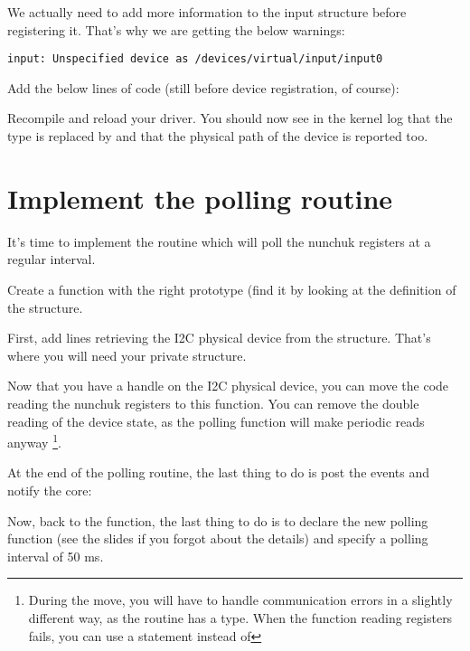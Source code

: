 We actually need to add more information to the input structure before
registering it. That's why we are getting the below warnings:

\begin{verbatim}
input: Unspecified device as /devices/virtual/input/input0
\end{verbatim}

Add the below lines of code (still before device registration, of
course):


Recompile and reload your driver. You should now see in the kernel log
that the  type is replaced by 
 and that the physical path of the device is reported
too. 

\section{Implement the polling routine}

It's time to implement the routine which will poll the nunchuk registers
at a regular interval. 

Create a  function with the right prototype (find
it by looking at the definition of the  structure.

First, add lines retrieving the I2C physical device from the
 structure. That's where you will need your
private  structure.

Now that you have a handle on the I2C physical device, you can move the
code reading the nunchuk registers to this function. You can
remove the double reading of the device state, as the polling function
will make periodic reads anyway \footnote{During the move, you will have
to handle communication errors in a slightly different way, as the
 routine has a  type. When the function 
reading registers fails, you can use a  statement instead
of }.

At the end of the polling routine, the last thing to do is post the events 
and notify the  core:


Now, back to the  function, the last thing to do
is to declare the new polling function (see the slides if you forgot
about the details) and specify a polling interval of 50 ms.

